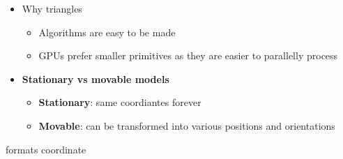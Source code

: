 \begin{itemize}
  \item Why triangles
  \begin{itemize}
    \item Algorithms are easy to be made
    \item GPUs prefer smaller primitives as they are easier to parallelly
    process
  \end{itemize}

  \item \textbf{Stationary vs movable models}
  \begin{itemize}
    \item \textbf{Stationary}: same coordiantes forever
    \item \textbf{Movable}: can be transformed into various positions and
    orientations
  \end{itemize}
\end{itemize}

{formats}
{coordinate}
